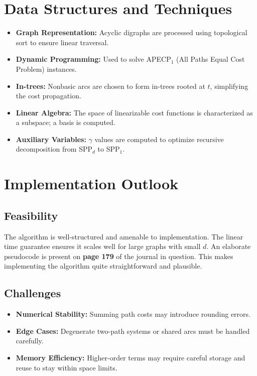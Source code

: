 \documentclass[12pt]{article}
\begin{document}
\section{Data Structures and Techniques}

\begin{itemize}[itemsep=2pt]
    \item \textbf{Graph Representation:} Acyclic digraphs are processed using topological sort to ensure linear traversal.
    \item \textbf{Dynamic Programming:} Used to solve APECP$_1$ (All Paths Equal Cost Problem) instances.
    \item \textbf{In-trees:} Nonbasic arcs are chosen to form in-trees rooted at $t$, simplifying the cost propagation.
    \item \textbf{Linear Algebra:} The space of linearizable cost functions is characterized as a subspace; a basis is computed.
    \item \textbf{Auxiliary Variables:} $\gamma$ values are computed to optimize recursive decomposition from SPP$_d$ to SPP$_1$.
\end{itemize}

\section{Implementation Outlook}

\subsection*{Feasibility}
The algorithm is well-structured and amenable to implementation. The linear time guarantee ensures it scales well for large graphs with small $d$. An elaborate pseudocode is present on \textbf{page 179} of the journal in question. This makes implementing the algorithm quite straightforward and plausible.

\subsection*{Challenges}
\begin{itemize}[itemsep=2pt]
    \item \textbf{Numerical Stability:} Summing path costs may introduce rounding errors.
    \item \textbf{Edge Cases:} Degenerate two-path systems or shared arcs must be handled carefully.
    \item \textbf{Memory Efficiency:} Higher-order terms may require careful storage and reuse to stay within space limits.
\end{itemize}
\end{document}
